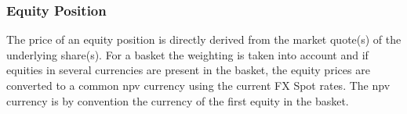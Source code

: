 \subsubsection{Equity Position}

The price of an equity position is directly derived from the market quote(s) of the underlying share(s). For a basket
the weighting is taken into account and if equities in several currencies are present in the basket, the equity prices
are converted to a common npv currency using the current FX Spot rates. The npv currency is by convention the currency
of the first equity in the basket.
